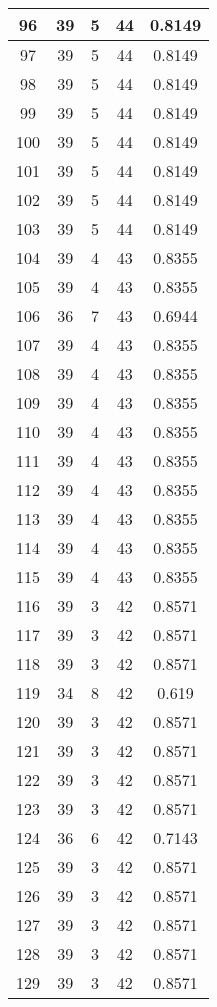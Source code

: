 \documentclass[letterpaper, 12pt]{article}
\begin{document}
\begin{longtable}{|c|c|c|c|c|}
\hline
96 & 39 & 5 & 44 & 0.8149 \\
\hline
97 & 39 & 5 & 44 & 0.8149 \\
\hline
98 & 39 & 5 & 44 & 0.8149 \\
\hline
99 & 39 & 5 & 44 & 0.8149 \\
\hline
100 & 39 & 5 & 44 & 0.8149 \\
\hline
101 & 39 & 5 & 44 & 0.8149 \\
\hline
102 & 39 & 5 & 44 & 0.8149 \\
\hline
103 & 39 & 5 & 44 & 0.8149 \\
\hline
104 & 39 & 4 & 43 & 0.8355 \\
\hline
105 & 39 & 4 & 43 & 0.8355 \\
\hline
106 & 36 & 7 & 43 & 0.6944 \\
\hline
107 & 39 & 4 & 43 & 0.8355 \\
\hline
108 & 39 & 4 & 43 & 0.8355 \\
\hline
109 & 39 & 4 & 43 & 0.8355 \\
\hline
110 & 39 & 4 & 43 & 0.8355 \\
\hline
111 & 39 & 4 & 43 & 0.8355 \\
\hline
112 & 39 & 4 & 43 & 0.8355 \\
\hline
113 & 39 & 4 & 43 & 0.8355 \\
\hline
114 & 39 & 4 & 43 & 0.8355 \\
\hline
115 & 39 & 4 & 43 & 0.8355 \\
\hline
116 & 39 & 3 & 42 & 0.8571 \\
\hline
117 & 39 & 3 & 42 & 0.8571 \\
\hline
118 & 39 & 3 & 42 & 0.8571 \\
\hline
119 & 34 & 8 & 42 & 0.619 \\
\hline
120 & 39 & 3 & 42 & 0.8571 \\
\hline
121 & 39 & 3 & 42 & 0.8571 \\
\hline
122 & 39 & 3 & 42 & 0.8571 \\
\hline
123 & 39 & 3 & 42 & 0.8571 \\
\hline
124 & 36 & 6 & 42 & 0.7143 \\
\hline
125 & 39 & 3 & 42 & 0.8571 \\
\hline
126 & 39 & 3 & 42 & 0.8571 \\
\hline
127 & 39 & 3 & 42 & 0.8571 \\
\hline
128 & 39 & 3 & 42 & 0.8571 \\
\hline
129 & 39 & 3 & 42 & 0.8571 \\

\end{longtable}
\end{document}

